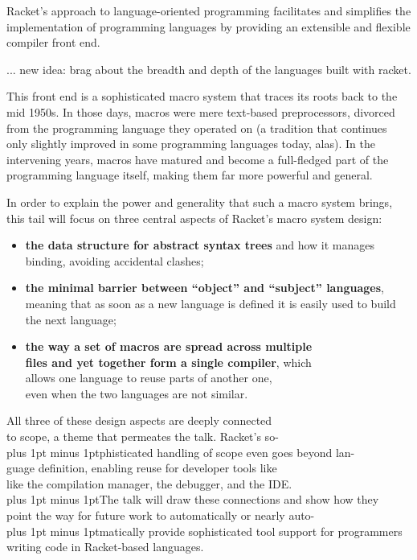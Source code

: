 \documentclass[runningheads]{llncs}
\newcommand{\MoreSpace}{\spaceskip 4pt plus 1pt minus 1pt}
\begin{document}
Racket's approach to language-oriented programming facilitates and
simplifies the implementation of programming languages by providing an
extensible and flexible compiler front end. 

... new idea: brag about the breadth and depth of the languages built with racket.

This front end is a sophisticated macro system that traces its roots back to the
mid 1950s. In those days, macros were mere text-based preprocessors,
divorced from the programming language they operated on (a tradition
that continues only slightly improved in some programming
languages today, alas). In the intervening years, macros have matured and
become a full-fledged part of the programming language itself, making
them far more powerful and general.

In order to explain the power and generality that such a macro system
brings, this tail will focus on three central aspects of Racket's
macro system design:
\begin{itemize}

\item \textbf{the data structure for abstract syntax trees} and how it
  manages binding, avoiding accidental clashes;

\item \textbf{the minimal barrier between ``object'' and ``subject''
  languages}, meaning that as soon as a new language is defined it
  is easily used to build\\ the next language;

\item 
\textbf{the way a set of macros are spread across multiple\\ files and
  yet together form a single compiler}, which\\ allows one language to
reuse parts of another one,\\ even when the two languages are not similar.
\end{itemize}

All three of these design aspects are deeply connected \\ to scope, a
theme that permeates the talk. Racket's so-\\
{\MoreSpace{}phisticated handling of scope even goes beyond lan-}\\
{guage definition, enabling reuse for developer tools like}\\ 
like the compilation manager, the debugger, and the IDE.\\
{\MoreSpace{}The talk will draw these connections and show how they}\\
point the way for future work to automatically or nearly auto-\\
{\MoreSpace{}matically provide sophisticated tool support for programmers}\\ 
writing code in Racket-based languages.
\end{document}
